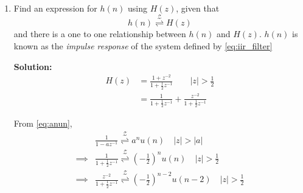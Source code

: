 \documentclass[journal,12pt,twocolumn]{IEEEtran}
\newcommand{\solution}{\noindent \textbf{Solution: }}
\providecommand{\brak}[1]{\ensuremath{\left(#1\right)}}
\providecommand{\abs}[1]{\left\vert#1\right\vert}
\providecommand{\ztrans}{\overset{\mathcal{Z}}{ \rightleftharpoons}}
\numberwithin{equation}{section}
\renewcommand\thesection{\arabic{section}}
\begin{document}
\begin{enumerate}[label=\thesection.\arabic*]

	
	\item \label{prob:impulse_resp}
	Find an expression for $h(n)$ using $H(z)$, given that 
	\begin{equation}
		\label{eq:impulse_resp}
		h(n) \ztrans H(z)
	\end{equation}
	and there is a one to one relationship between $h(n)$ and $H(z)$. $h(n)$ is known as the {\em impulse response} of the system defined by \eqref{eq:iir_filter}
	
	\solution
	\begin{align}
		H(z) &= \frac{1 + z^{-2}}{1 + \frac12 z^{-1}} \qquad \abs{z} > \frac12 \\
		&= \frac{1}{1 + \frac12 z^{-1}} + \frac{z^{-2}}{1 + \frac12 z^{-1}}
	\end{align}
	
	From \eqref{eq:anun},
	\begin{align}
		&\frac{1}{1-az^{-1}} \ztrans a^nu(n)  \quad \abs{z} > \abs{a} \\
		\implies &\frac{1}{1 + \frac12 z^{-1}} \ztrans \brak{-\frac12}^n u(n) \quad \abs{z} > \frac12 \\
		\implies &\frac{z^{-2}}{1 + \frac12 z^{-1}} \ztrans \brak{-\frac12}^{n-2} u(n-2) \quad \abs{z} > \frac12
	\end{align}
	

\end{enumerate}
\end{document}
